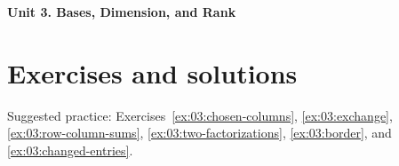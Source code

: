 \documentclass[12pt]{article}
\begin{document}
{\Large\bfseries Unit 3. Bases, Dimension, and Rank}\par

\clearpage
\section*{Exercises and solutions}
Suggested practice: Exercises~\ref{ex:03:chosen-columns},
\ref{ex:03:exchange}, \ref{ex:03:row-column-sums},
\ref{ex:03:two-factorizations}, \ref{ex:03:border}, and
\ref{ex:03:changed-entries}.

\end{document}
